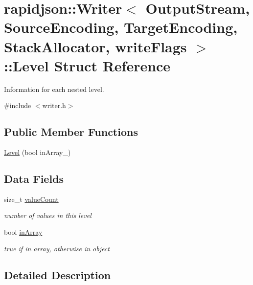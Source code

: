 \hypertarget{structrapidjson_1_1_writer_1_1_level}{}\section{rapidjson\+::Writer$<$ Output\+Stream, Source\+Encoding, Target\+Encoding, Stack\+Allocator, write\+Flags $>$\+::Level Struct Reference}
\label{structrapidjson_1_1_writer_1_1_level}


Information for each nested level.  




{\ttfamily \#include $<$writer.\+h$>$}

\subsection*{Public Member Functions}
\begin{DoxyCompactItemize}
\item 
\mbox{\hyperlink{structrapidjson_1_1_writer_1_1_level_aa12b98bd13c621e6a19cdb67d118f510}{Level}} (bool in\+Array\+\_\+)
\end{DoxyCompactItemize}
\subsection*{Data Fields}
\begin{DoxyCompactItemize}
\item 
size\+\_\+t \mbox{\hyperlink{structrapidjson_1_1_writer_1_1_level_a5d17bdfa9ded5de72f5f91175cc3e36b}{value\+Count}}
\begin{DoxyCompactList}\small\item\em number of values in this level \end{DoxyCompactList}\item 
bool \mbox{\hyperlink{structrapidjson_1_1_writer_1_1_level_a59255e3b1d371161f7c894503cfd6bec}{in\+Array}}
\begin{DoxyCompactList}\small\item\em true if in array, otherwise in object \end{DoxyCompactList}\end{DoxyCompactItemize}


\subsection{Detailed Description}
